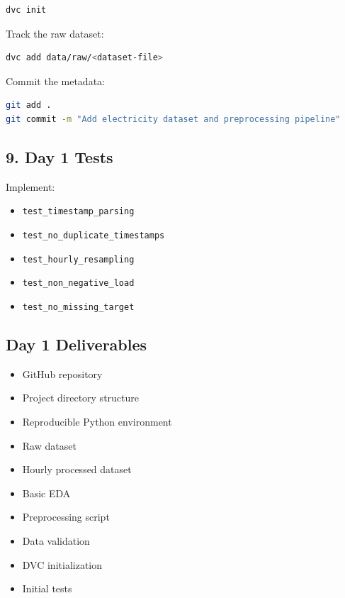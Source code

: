 \documentclass[11pt,a4paper]{article}
\newcommand{\done}{\textbf{\textcolor{codegreen}{✓}}}
\begin{document}
\begin{lstlisting}[language=bash]
dvc init
\end{lstlisting}

Track the raw dataset:

\begin{lstlisting}[language=bash]
dvc add data/raw/<dataset-file>
\end{lstlisting}

Commit the metadata:

\begin{lstlisting}[language=bash]
git add .
git commit -m "Add electricity dataset and preprocessing pipeline"
\end{lstlisting}

\subsection{9. Day 1 Tests}

Implement:

\begin{itemize}
    \item \texttt{test\_timestamp\_parsing}
    \item \texttt{test\_no\_duplicate\_timestamps}
    \item \texttt{test\_hourly\_resampling}
    \item \texttt{test\_non\_negative\_load}
    \item \texttt{test\_no\_missing\_target}
\end{itemize}

\subsection{Day 1 Deliverables}

\begin{itemize}
    \item[\done] GitHub repository
    \item[\done] Project directory structure
    \item[\done] Reproducible Python environment
    \item[\done] Raw dataset
    \item[\done] Hourly processed dataset
    \item[\done] Basic EDA
    \item[\done] Preprocessing script
    \item[\done] Data validation
    \item[\done] DVC initialization
    \item[\done] Initial tests
\end{itemize}
\end{document}
